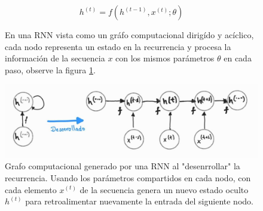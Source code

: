 \begin{equation}
    h^{(t)} = f(h^{(t-1)}, x^{(t)}; \theta)
\end{equation}
\label{eq:rnn}
\begin{figure}[]

En una RNN vista como un gráfo computacional dirigído y acíclico, cada nodo representa un estado en
la recurrencia y procesa la información de la secuencia $x$ con los mismos parámetros $\theta$ en cada
paso, observe la figura \ref{fig:rnn_cg}.

\centering

\includegraphics[width=.8\textwidth]{Chapters/1. Transformer/Figures/rnn/rnn_cgraph.jpg}

\caption[RNN - Grafo Computacional]{Grafo computacional generado por una RNN al "desenrrollar" la
recurrencia. Usando los parámetros compartidos en cada nodo, con cada elemento $x^{(t)}$ de la
secuencia genera un nuevo estado oculto $h^{(t)}$ para retroalimentar nuevamente la entrada del
siguiente nodo.}

\label{fig:rnn_cg}
\end{figure}
